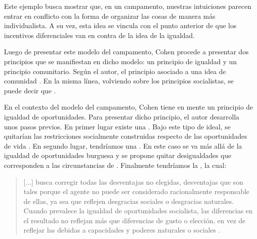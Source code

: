 Este ejemplo busca mostrar que, en un campamento, nuestras intuiciones parecen entrar en conflicto con la forma de organizar las cosas de manera más individualista. A su vez, esta idea se vincula con el punto anterior de que los incentivos diferenciales van en contra de la idea de la igualdad.  

Luego de presentar este modelo del campamento, Cohen procede a presentar dos principios que se manifiestan en dicho modelo: un principio de igualdad y un principio comunitario. Según el autor, el principio asociado a una idea de comunidad  \citep[p. 183]{Cohen_2014c}. En la misma línea, volviendo sobre los principios socialistas, se puede decir que  \citep[p. 62]{Cohen_2014b}.

En el contexto del modelo del campamento, Cohen tiene en mente un principio de igualdad de oportunidades. Para presentar dicho principio, el autor desarrolla unos pasos previos. En primer lugar existe una . Bajo este tipo de ideal, se quitarían las restricciones socialmente construidas respecto de las oportunidades de vida  \citep[p. 184]{Cohen_2014c}. En segundo lugar, tendríamos una . En este caso se va más allá de la igualdad de oportunidades burguesa y se propone quitar desigualdades que corresponden a las circunstancias de  \citep[p. 185]{Cohen_2014c}. Finalmente tendríamos la , la cual: 

\vspace{3mm}
\begin{quote}
    [...] busca corregir todas las desventajas no elegidas, desventajas que son tales porque el agente no puede ser considerado racionalmente responsable de ellas, ya sea que reflejen desgracias sociales o desgracias naturales. Cuando prevalece la igualdad de oportunidades socialista, las diferencias en el resultado no reflejan más que diferencias de gusto o elección, en vez de reflejar las debidas a capacidades y poderes naturales o sociales \citep[p. 186]{Cohen_2014c}.
\end{quote}
\vspace{3mm}


